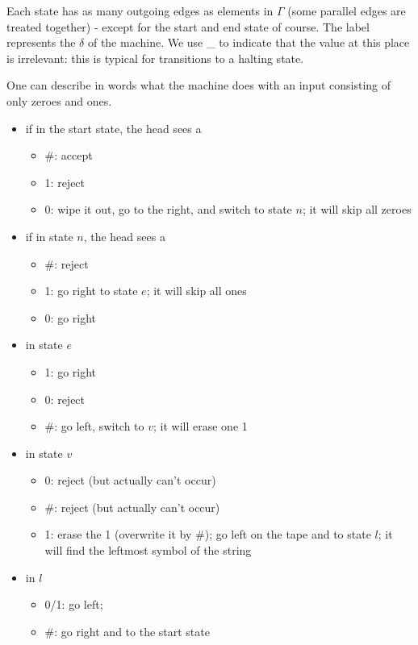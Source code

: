 Each state has as many outgoing edges as elements in $\Gamma$ (some
parallel edges are treated together) - except for the start and end
state of course. The label represents the $\delta$ of the machine. We
use \_ to indicate that the value at this place is irrelevant: this is
typical for transitions to a halting state.


One can describe in words what the machine does with an input
consisting of only zeroes and ones.

\begin{itemize}
\item if in the start state, the head sees a
\begin{itemize}
\item \#: accept
\item 1: reject
\item 0: wipe it out, go to the right, and switch to state $n$; it
  will skip all zeroes
\end{itemize}

\item if in state $n$, the head sees a 
\begin{itemize}
\item \#: reject
\item 1: go right to state $e$; it will skip all ones
\item 0: go right
\end{itemize}


\item in state $e$
\begin{itemize}
\item 1: go right
\item 0: reject
\item \#: go left, switch to $v$; it will erase one 1
\end{itemize}

\item in state $v$
\begin{itemize}
\item 0: reject (but actually can't occur)
\item \#: reject (but actually can't occur)
\item 1: erase the 1 (overwrite it by \#); go left on the tape and to
  state $l$; it will find the leftmost symbol of the string
\end{itemize}

\item in $l$
\begin{itemize}
\item 0/1: go left;
\item \#: go right and to the start state
\end{itemize}

\end{itemize}

